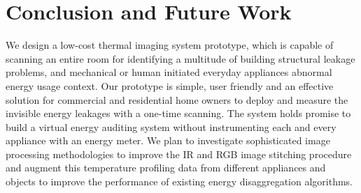 \section{Conclusion and Future Work}
\label{sec:concl}
We design a low-cost thermal imaging system prototype, {\IRLeak}  which is capable of scanning an entire room for identifying a multitude of building structural leakage problems, and mechanical or human initiated everyday appliances abnormal energy usage context. Our prototype is simple, user friendly and an effective solution for commercial and residential home owners to deploy and measure the invisible energy leakages with a one-time scanning. The {\IRLeak} system holds promise to build a virtual energy auditing system without instrumenting each and every appliance with an energy meter. We plan to investigate sophisticated image processing methodologies to improve the IR and RGB image stitching procedure and augment this temperature profiling data from different appliances and objects to improve the performance of existing energy disaggregation algorithms.
